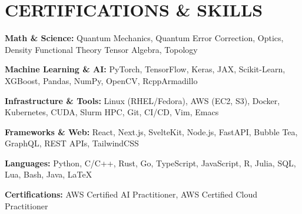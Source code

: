 \documentclass[letterpaper,10pt]{article}
\newcommand{\resumeItemListStart}{
  \vspace{-4pt}
  \begin{list}{\textbullet}{
    \setlength{\leftmargin}{0.15in}
    \setlength{\labelwidth}{0.15in}
    \setlength{\labelsep}{0.05in}
    \setlength{\itemsep}{0pt} 
    \setlength{\parsep}{0pt}
    \setlength{\topsep}{0pt}
    \setlength{\partopsep}{0pt}
}}
\newcommand{\resumeItemListEnd}{\end{list}\vspace{-1pt}}
\begin{document}
\section{CERTIFICATIONS \& SKILLS}
    \vspace{2pt}
 \resumeItemListStart
    \item \small{\textbf{Math \& Science:} Quantum Mechanics, Quantum Error Correction, Optics, Density Functional Theory  Tensor Algebra, Topology}
    \item \small{\textbf{Machine Learning \& AI:} PyTorch, TensorFlow, Keras, JAX, Scikit-Learn, XGBoost, Pandas, NumPy, OpenCV, RcppArmadillo}
    \item \small{\textbf{Infrastructure \& Tools:} Linux (RHEL/Fedora), AWS (EC2, S3), Docker, Kubernetes, CUDA, Slurm HPC, Git, CI/CD, Vim, Emacs}
    \item \small{\textbf{Frameworks \& Web:} React, Next.js, SvelteKit, Node.js, FastAPI, Bubble Tea, GraphQL, REST APIs, TailwindCSS}
    \item \small{\textbf{Languages:} Python, C/C++, Rust, Go, TypeScript, JavaScript, R, Julia, SQL, Lua, Bash, Java, \LaTeX}
    \item \small{\textbf{Certifications:} AWS Certified AI Practitioner, AWS Certified Cloud Practitioner}
 \resumeItemListEnd
\end{document}
